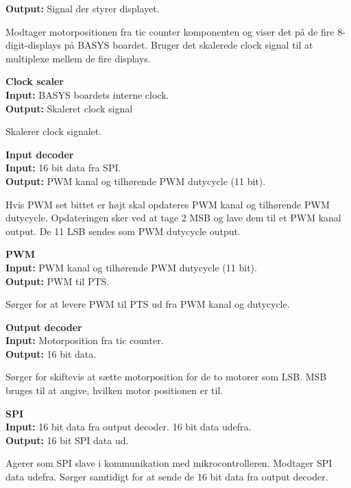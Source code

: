 \textbf{Output:} Signal der styrer displayet.

Modtager motorpositionen fra tic counter komponenten og viser det på de fire 8-digit-displays 
på BASYS boardet. Bruger det skalerede clock signal til at multiplexe mellem de 
fire displays.

\textbf{Clock scaler}\\
\textbf{Input:} BASYS boardets interne clock.\\
\textbf{Output:} Skaleret clock signal

Skalerer clock signalet.

\textbf{Input decoder}\\
\textbf{Input:} 16 bit data fra SPI.\\
\textbf{Output:} PWM kanal og tilhørende PWM dutycycle (11 bit).

Hvis PWM set bittet er højt skal opdateres PWM kanal og tilhørende PWM dutycycle.
Opdateringen sker ved at tage 2 MSB og lave dem til et PWM kanal output. De 11 
LSB sendes som PWM dutycycle output.

\textbf{PWM}\\
\textbf{Input:} PWM kanal og tilhørende PWM dutycycle (11 bit).\\
\textbf{Output:} PWM til PTS.

Sørger for at levere PWM til PTS ud fra PWM kanal og dutycycle.

\textbf{Output decoder}\\
\textbf{Input:} Motorposition fra tic counter.\\
\textbf{Output:} 16 bit data.

Sørger for skiftevis at sætte motorposition for de to motorer som LSB.
MSB bruges til at angive, hvilken motor positionen er til.

\textbf{SPI}\\
\textbf{Input:} 16 bit data fra output decoder. 16 bit data udefra.\\
\textbf{Output:} 16 bit SPI data ud.

Agerer som SPI slave i kommunikation med mikrocontrolleren.
Modtager SPI data udefra. Sørger samtidigt for at sende de 16 bit data fra output decoder.






